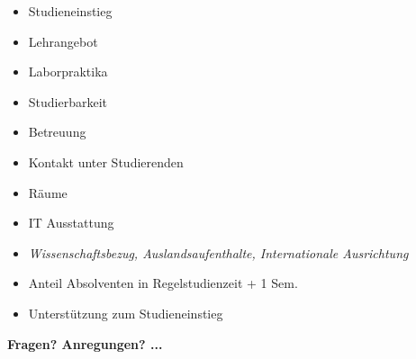 \documentclass[
	paper=128mm:96mm,%
	fontsize=11pt,%
	pagesize ,%
	parskip=half -,%
	numbers=noendperiod ,%
	captions=nooneline%
	,bibliography=totoc,listof=totoc, index=totoc,DIV=calc
]{scrartcl}
\begin{document}
\begin{multicols}{2}
		\begin{itemize}[label=\color{mydotcolor2}$\pmb\rightarrow$]
			\item Studieneinstieg
			\item Lehrangebot
			\item Laborpraktika
			\item Studierbarkeit
			\item Betreuung
			\item Kontakt unter Studierenden
			\item Räume
			\item IT Ausstattung
			\item \emph{Wissenschaftsbezug, Auslandsaufenthalte, Internationale Ausrichtung}
			\item Anteil Absolventen in Regelstudienzeit + 1 Sem.
			\item Unterstützung zum Studieneinstieg
		\end{itemize}
\end{multicols}
\pagebreak
{}

\pagebreak
\thispagestyle{empty}
{\color{myfontcolor1}
	\begin{center}
		{\Huge \textbf{Fragen? Anregungen? ...}}\\
	\end{center}
}
\end{document}
